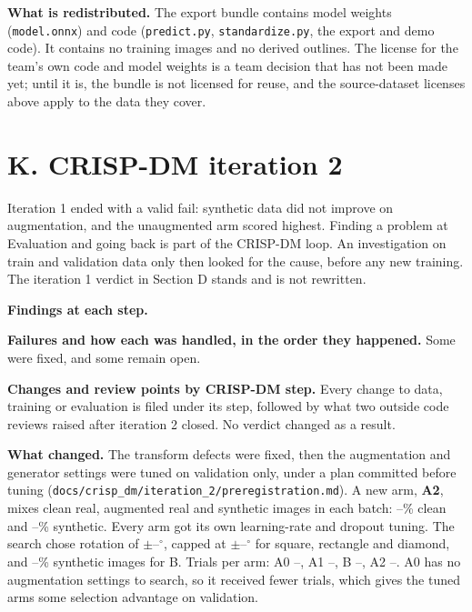 \documentclass[11pt]{article}
\providecommand{\ItwoRotate}{--}
\providecommand{\ItwoRotateCap}{--}
\providecommand{\ItwoAtwoClean}{--}
\providecommand{\ItwoAtwoSynth}{--}
\providecommand{\ItwoBSynth}{--}
\providecommand{\ItwoTrialsAzero}{--}
\providecommand{\ItwoTrialsAone}{--}
\providecommand{\ItwoTrialsB}{--}
\providecommand{\ItwoTrialsAtwo}{--}
\begin{document}
\textbf{What is redistributed.} The export bundle contains model weights
(\nolinkurl{model.onnx}) and code (\nolinkurl{predict.py},
\nolinkurl{standardize.py}, the export and demo code). It contains no training
images and no derived outlines. The license for the team's own code and model
weights is a team decision that has not been made yet; until it is, the bundle
is not licensed for reuse, and the source-dataset licenses above apply to the
data they cover.

\newpage
\section*{K. CRISP-DM iteration 2}

Iteration 1 ended with a valid fail: synthetic data did not improve on
augmentation, and the unaugmented arm scored highest. Finding a problem at
Evaluation and going back is part of the CRISP-DM loop. An investigation on
train and validation data only then looked for the cause, before any new
training. The iteration 1 verdict in Section D stands and is not rewritten.

\textbf{Findings at each step.}

{\small{}}

\textbf{Failures and how each was handled, in the order they happened.} Some were fixed, and some remain open.

{\small{}}

\textbf{Changes and review points by CRISP-DM step.} Every change to data,
training or evaluation is filed under its step, followed by what two outside
code reviews raised after iteration 2 closed. No verdict changed as a result.

{\small{}}

\textbf{What changed.} The transform defects were fixed, then the augmentation
and generator settings were tuned on validation only, under a plan committed
before tuning (\nolinkurl{docs/crisp_dm/iteration_2/preregistration.md}). A new
arm, \textbf{A2}, mixes clean real, augmented real and synthetic images in each
batch: \ItwoAtwoClean\% clean and \ItwoAtwoSynth\% synthetic. Every arm got its
own learning-rate and dropout tuning. The search chose rotation of
$\pm$\ItwoRotate$^\circ$, capped at $\pm$\ItwoRotateCap$^\circ$ for square,
rectangle and diamond, and \ItwoBSynth\% synthetic images for B. Trials per arm:
A0 \ItwoTrialsAzero, A1 \ItwoTrialsAone, B \ItwoTrialsB, A2 \ItwoTrialsAtwo.
A0 has no augmentation settings to search, so it received fewer trials, which
gives the tuned arms some selection advantage on validation.
\end{document}
